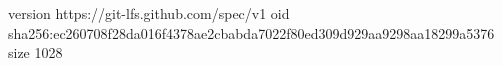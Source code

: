 version https://git-lfs.github.com/spec/v1
oid sha256:ec260708f28da016f4378ae2cbabda7022f80ed309d929aa9298aa18299a5376
size 1028
